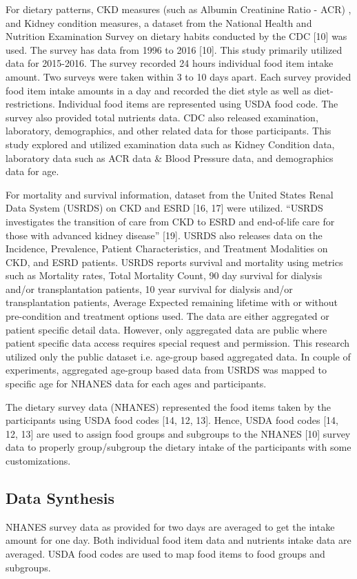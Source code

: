 \noindent For dietary patterns, CKD measures (such as Albumin Creatinine Ratio - ACR) , and Kidney condition measures, a dataset from the National Health and Nutrition Examination Survey on dietary habits conducted by the CDC [10] was used. The survey has data from 1996 to 2016 [10]. This study primarily utilized data for 2015-2016. The survey recorded 24 hours individual food item intake amount. Two surveys were taken within 3 to 10 days apart. Each survey provided food item intake amounts in a day and recorded the diet style as well as diet-restrictions. Individual food items are represented using USDA food code. The survey also provided total nutrients data. CDC also released examination, laboratory, demographics, and other related data for those participants. This study explored and utilized examination data such as Kidney Condition data, laboratory data such as ACR data \& Blood Pressure data, and demographics data for age.

\medskip 
\noindent For mortality and survival information, dataset from the United States Renal Data System (USRDS) on CKD and ESRD [16, 17] were utilized. “USRDS investigates the transition of care from CKD to ESRD and end-of-life care for those with advanced kidney disease” [19]. USRDS also releases data on the Incidence, Prevalence, Patient Characteristics, and Treatment Modalities on CKD, and ESRD patients. USRDS  reports survival and mortality using metrics such as Mortality rates, Total Mortality Count,  90 day survival for dialysis and/or transplantation patients,  10 year survival for dialysis and/or transplantation patients, Average Expected remaining lifetime with or without pre-condition and treatment options used.  The data are either aggregated or patient specific detail data. However, only aggregated data are public where patient specific data access requires special request and permission. This research utilized only the public dataset i.e. age-group based aggregated data. In couple of experiments, aggregated age-group based data from USRDS was mapped to specific age for NHANES data for each ages and participants.

\medskip
\noindent The dietary survey data (NHANES) represented the food items taken by the participants using USDA food codes [14, 12, 13]. Hence, USDA food codes [14, 12, 13] are used to assign food groups and subgroups to the NHANES [10] survey data to properly group/subgroup the dietary intake of the participants with some customizations.

\subsection{Data Synthesis}
\noindent NHANES survey data as provided for two days are averaged to get the intake amount for one day. Both individual food item data and nutrients intake data are averaged. USDA food codes are used to map food items to food groups and subgroups.

